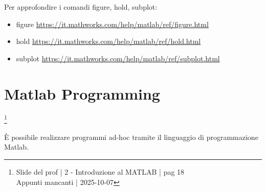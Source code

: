 \begin{tcolorbox}
    Per approfondire i comandi figure, hold, subplot: 

    \begin{itemize}
        \item figure \url{https://it.mathworks.com/help/matlab/ref/figure.html} 
        \item hold \url{https://it.mathworks.com/help/matlab/ref/hold.html} 
        \item subplot \url{https://it.mathworks.com/help/matlab/ref/subplot.html}
    \end{itemize} 

\end{tcolorbox}

\newpage 

\section{Matlab Programming}

\footnote{ 
    Slide del prof | 2 - Introduzione al MATLAB | pag 18\\
    Appunti mancanti | 2025-10-07 
}

È possibile realizzare programmi ad-hoc tramite il linguaggio di programmazione Matlab. \newline 

